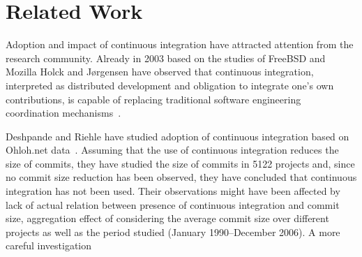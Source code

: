 \section{Related Work}
\label{sec:rw}
Adoption and impact of continuous integration have attracted  attention from the research community. Already in 2003 based on the studies of FreeBSD and Mozilla Holck and J{\o}rgensen have observed that continuous integration, interpreted as distributed development and obligation to integrate one's own contributions, is capable of replacing traditional software engineering coordination mechanisms~\cite{HolckJ03}.  


Deshpande and Riehle have studied adoption of continuous integration based on Ohloh.net data~\cite{Deshpande2008}. Assuming that the use of continuous integration reduces the size of commits, they have studied the size of commits in 5122 projects and, since no commit size reduction has been observed, they have concluded that continuous integration has not been used. Their observations might have been affected by lack of actual relation between presence of continuous integration and commit size, aggregation effect of considering the average commit size over different projects as well as the period studied (January 1990--December 2006). A more careful investigation 